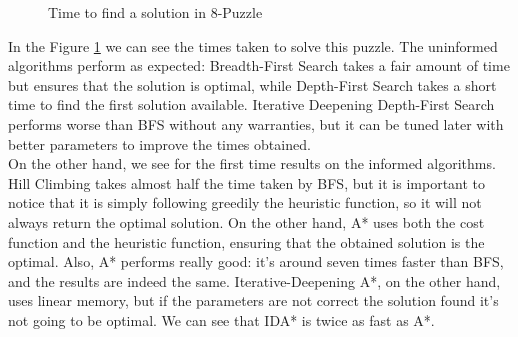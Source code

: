 \begin{figure}[!htbp]
  \centering
  \caption{Time to find a solution in 8-Puzzle}
  \label{8p:time}
\end{figure}

In the Figure \ref{8p:time} we can see the times taken to solve this puzzle.
The uninformed algorithms perform as expected: Breadth-First Search takes a
fair amount of time but ensures that the solution is optimal, while Depth-First
Search takes a short time to find the first solution available. Iterative
Deepening Depth-First Search performs worse than BFS without any warranties,
but it can be tuned later with better parameters to improve the times
obtained.\\

On the other hand, we see for the first time results on the informed
algorithms. Hill Climbing takes almost half the time taken by BFS, but it is
important to notice that it is simply following greedily the heuristic
function, so it will not always return the optimal solution. On the other hand,
A* uses both the cost function and the heuristic function, ensuring that the
obtained solution is the optimal. Also, A* performs really good: it's around
seven times faster than BFS, and the results are indeed the same.
Iterative-Deepening A*, on the other hand, uses linear memory, but if the
parameters are not correct the solution found it's not going to be optimal. We
can see that IDA* is twice as fast as A*.\\

